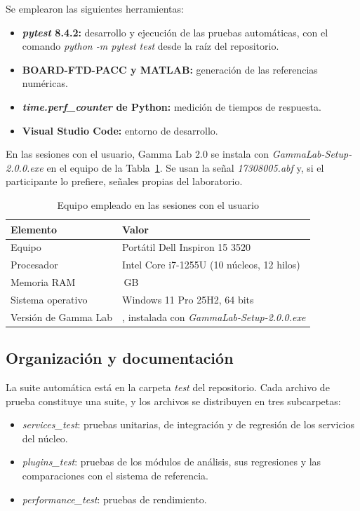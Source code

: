 \documentclass[12pt,letterpaper,oneside]{article}
\begin{document}
Se emplearon las siguientes herramientas:

\begin{itemize}
  \item \textbf{\textit{pytest} 8.4.2:} desarrollo y ejecución de las pruebas automáticas, con el comando \textit{python -m pytest test} desde la raíz del repositorio.  \item \textbf{BOARD-FTD-PACC y MATLAB:} generación de las referencias numéricas.
  \item \textbf{\textit{time.perf\_counter} de Python:} medición de tiempos de respuesta.
  \item \textbf{Visual Studio Code:} entorno de desarrollo.
\end{itemize}

En las sesiones con el usuario, Gamma Lab 2.0 se instala con \textit{GammaLab-Setup-2.0.0.exe} en el equipo de la Tabla~\ref{tab:pruebas_equipo_usuario}. Se usan la señal \textit{17308005.abf} y, si el participante lo prefiere, señales propias del laboratorio.

\begin{table}[H]
\centering
\scriptsize
\renewcommand{\arraystretch}{1.3}
\begin{tabularx}{\textwidth}{|l|>{\raggedright\arraybackslash}X|}
\hline
\textbf{Elemento} & \textbf{Valor} \\
\hline
Equipo & Portátil Dell Inspiron 15 3520 \\
\hline
Procesador & Intel Core i7-1255U (10 núcleos, 12 hilos) \\
\hline
Memoria RAM & 24\,GB \\
\hline
Sistema operativo & Windows 11 Pro 25H2, 64 bits \\
\hline
Versión de Gamma Lab & 2.0, instalada con \textit{GammaLab-Setup-2.0.0.exe} \\
\hline
\end{tabularx}
\caption{Equipo empleado en las sesiones con el usuario}
\label{tab:pruebas_equipo_usuario}
\end{table}

\subsection{Organización y documentación}

La suite automática está en la carpeta \textit{test} del repositorio. Cada archivo de prueba constituye una suite, y los archivos se distribuyen en tres subcarpetas:

\begin{itemize}
  \item \textit{services\_test}: pruebas unitarias, de integración y de regresión de los servicios del núcleo.
  \item \textit{plugins\_test}: pruebas de los módulos de análisis, sus regresiones y las comparaciones con el sistema de referencia.
  \item \textit{performance\_test}: pruebas de rendimiento.
\end{itemize}
\end{document}
